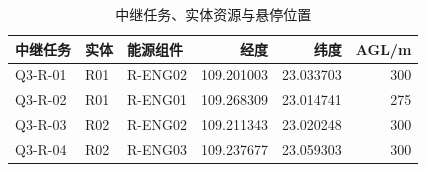 \begin{table}[htbp]\centering\small
\caption{中继任务、实体资源与悬停位置}\label{tab:q3_sites}
\begin{tabular}{@{}lllrrr@{}}
\toprule
中继任务 & 实体 & 能源组件 & 经度 & 纬度 & AGL/m\\
\midrule
Q3-R-01 & R01 & R-ENG02 & 109.201003 & 23.033703 & 300\\
Q3-R-02 & R01 & R-ENG01 & 109.268309 & 23.014741 & 275\\
Q3-R-03 & R02 & R-ENG02 & 109.211343 & 23.020248 & 300\\
Q3-R-04 & R02 & R-ENG03 & 109.237677 & 23.059303 & 300\\
\bottomrule
\end{tabular}
\end{table}
